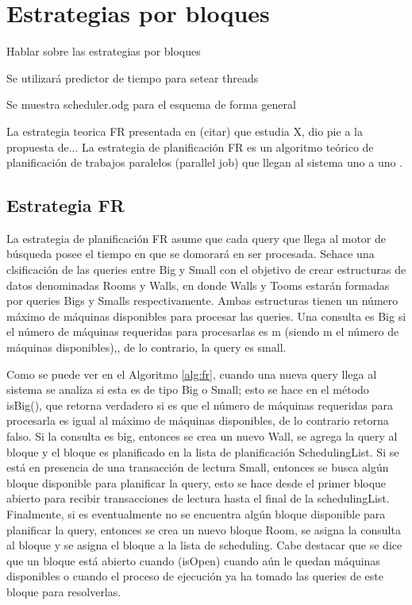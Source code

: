 \section{Estrategias por bloques}
\label{scheduling:bloques}

Hablar sobre las estrategias por bloques

Se utilizará predictor de tiempo para setear threads

Se muestra scheduler.odg para el esquema de forma general

La estrategia teorica FR presentada en (citar) que estudia X, dio pie a la propuesta de... 
La estrategia de planificación FR es un algoritmo teórico de planificación de trabajos paralelos (parallel job) que llegan al sistema uno a uno \citep{Ye:2007}.


\subsection{Estrategia FR}
\label{scheduling:fr}
La estrategia de planificación FR asume que cada query que llega al motor de búsqueda posee el tiempo en que se domorará en ser procesada. 
Sehace una clsificación de las queries entre Big y Small con el objetivo de crear estructuras de datos denominadas Rooms y Walls, en donde Walls y Tooms estarán formadas por queries Bigs y Smalls respectivamente. Ambas estructuras tienen un número máximo de máquinas disponibles para procesar las queries. Una consulta es Big si el número de máquinas requeridas para procesarlas es m (siendo m el número de máquinas disponibles),, de lo contrario, la query es small. 

Como se puede ver en el Algoritmo \ref{alg:fr}, cuando una nueva query llega al sistema se analiza si esta es de tipo Big o Small; esto se hace en el método isBig(), que retorna verdadero si es que el número de máquinas requeridas para procesarla es igual al máximo de máquinas disponibles, de lo contrario retorna falso. Si la consulta es big, entonces se crea un nuevo Wall, se agrega la query al bloque y el bloque es planificado en la lista de planificación SchedulingList. Si se está en presencia de una transacción de lectura Small, entonces se busca algún bloque disponible para planificar la query, esto se hace desde el primer bloque abierto para recibir transacciones de lectura hasta el final de la schedulingList. Finalmente, si es eventualmente no se encuentra algún bloque disponible para planificar la query, entonces se crea un nuevo bloque Room, se asigna la consulta al bloque y se asigna el bloque a la lista de scheduling. Cabe destacar que se dice que un bloque está abierto cuando (isOpen) cuando aún le quedan máquinas disponibles o cuando el proceso de ejecución ya ha tomado las queries de este bloque para resolverlas.

